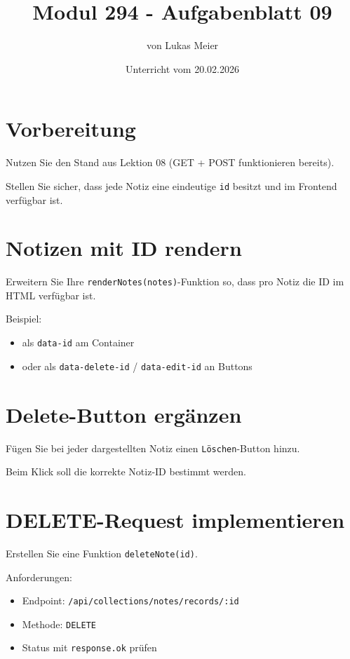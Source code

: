 \documentclass[a4paper,12pt]{article}
\title{Modul 294 - Aufgabenblatt 09}
\author{von Lukas Meier}
\date{Unterricht vom 20.02.2026}
\begin{document}
\maketitle

\section{Vorbereitung}

Nutzen Sie den Stand aus Lektion 08 (GET + POST funktionieren bereits).

Stellen Sie sicher, dass jede Notiz eine eindeutige \texttt{id} besitzt und im Frontend verfügbar ist.

\section{Notizen mit ID rendern}

Erweitern Sie Ihre \texttt{renderNotes(notes)}-Funktion so, dass pro Notiz die ID im HTML verfügbar ist.

Beispiel:
\begin{itemize}
    \item als \texttt{data-id} am Container
    \item oder als \texttt{data-delete-id} / \texttt{data-edit-id} an Buttons
\end{itemize}

\section{Delete-Button ergänzen}

Fügen Sie bei jeder dargestellten Notiz einen \texttt{Löschen}-Button hinzu.

Beim Klick soll die korrekte Notiz-ID bestimmt werden.

\section{DELETE-Request implementieren}

Erstellen Sie eine Funktion \texttt{deleteNote(id)}.

Anforderungen:
\begin{itemize}
    \item Endpoint: \texttt{/api/collections/notes/records/:id}
    \item Methode: \texttt{DELETE}
    \item Status mit \texttt{response.ok} prüfen
\end{itemize}
\end{document}
